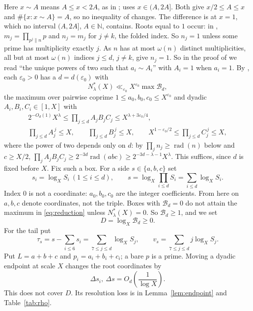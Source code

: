 \documentclass{amsart}
\numberwithin{equation}{section}
\numberwithin{table}{section}
\newcommand{\rad}{\operatorname{rad}}
\newcommand{\N}{\mathbb{N}}
\begin{document}
Here $x\sim A$ means $A\le x<2A$, as in \cite{Be}; \cite{BBLT} uses
$x\in(A,2A]$. Both give $x/2\le A\le x$ and $\#\{x:x\sim A\}=A$, so no
inequality of \cite{BBLT} changes. The difference is at $x=1$, which no
interval $(A,2A]$, $A\in\N$, contains. Roots equal to $1$ occur: in
\cite[Lemma~2.2]{BBLT}, $m_j=\prod_{p^{j}\|n}p$ and $n_j=m_j$ for $j\ne k$, the
folded index. So $n_j=1$ unless some prime has multiplicity exactly $j$. As
$n$ has at most $\omega(n)$ distinct multiplicities, all but at most
$\omega(n)$ indices $j\le d$, $j\ne k$, give $n_j=1$. So in the proof
of \cite[Proposition~2.1]{BBLT} we read ``the unique powers of two such that
$a_i\sim A_i$'' with $A_i=1$ when $a_i=1$. By \cite[Proposition~2.1]{BBLT},
each $\varepsilon_0>0$ has a $d=d(\varepsilon_0)$ with
\begin{equation}\label{eq:reduction}
 N^*_\lambda(X)\ll_{\varepsilon_0}X^{\varepsilon_0}\max \mathcal B_d,
\end{equation}
the maximum over pairwise coprime $1\le a_0,b_0,c_0\le X^{\varepsilon_0}$ and
dyadic $A_i,B_i,C_i\in[1,X]$ with
\begin{equation}\label{eq:boxconstraints}
 \begin{gathered}
  2^{-O_d(1)}X^{\lambda}\le\prod_{j\le d}A_jB_jC_j\le X^{\lambda+3\varepsilon_0/4},\\
  \prod_{j\le d}A_j^{\,j}\le X,\qquad
  \prod_{j\le d}B_j^{\,j}\le X,\qquad
 X^{1-\varepsilon_0/2}\le\prod_{j\le d}C_j^{\,j}\le X ,
 \end{gathered}
\end{equation}
where the power of two depends only on $d$: by $\prod_jn_j\ge\rad(n)$ below
and $c\ge X/2$, $\prod_jA_jB_jC_j\ge2^{-3d}\rad(abc)\ge2^{-3d-\lambda-1}X^\lambda$.
This suffices, since $d$ is fixed before $X$. Fix such a box. For a side $s\in\{a,b,c\}$ set
\begin{equation}\label{eq:coord}
 s_i=\log_XS_i\ (1\le i\le d),\qquad
 s=\log_X\!\prod_{i\le d}S_i=\sum_{i\le d}\log_XS_i .
\end{equation}
Index $0$ is not a coordinate: $a_0,b_0,c_0$ are the integer coefficients.
From here on $a,b,c$ denote coordinates, not the triple.
Boxes with $\mathcal B_d=0$ do not attain the maximum in \eqref{eq:reduction}
unless $N^*_{\lambda}(X)=0$. So $\mathcal B_d\ge1$, and we set
\begin{equation*}
 D=\log_X\mathcal B_d\ge0.
\end{equation*}
For the tail put
\begin{equation}\label{eq:tailcoord}
 \tau_s=s-\sum_{i\le6}s_i=\sum_{7\le j\le d}\log_XS_j,
 \qquad
 v_s=\sum_{7\le j\le d}j\log_XS_j .
\end{equation}
Put $L=a+b+c$ and $p_i=a_i+b_i+c_i$; a bare $p$ is a prime. Moving a
dyadic endpoint at scale $X$ changes the root coordinates by
\begin{equation}\label{eq:dyadicshift}
 \Delta s_i,\ \Delta s=O_d\!\left(\frac1{\log X}\right).
\end{equation}
This does not cover $D$. Its resolution loss is in Lemma~\ref{lem:endpoint}
and Table~\ref{tab:rho}.
\end{document}
